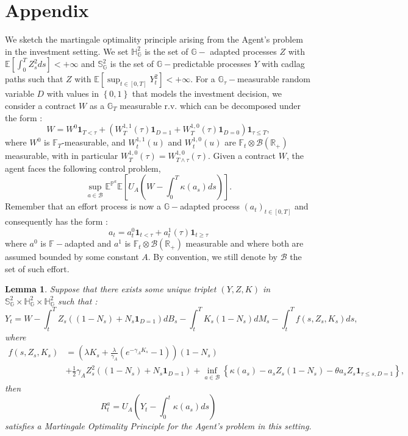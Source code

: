 \documentclass[numbook, envcountsect, envcountsame, envcountreset, runningheads, smallextended]{article}
\newtheorem{Lemma}{Lemma}[part]
\def \E{\mathbb{E}}
\begin{document}
\section{Appendix}
We sketch the martingale optimality principle arising from the Agent’s problem in the investment setting. We set
$\mathbb{H}^2_{\mathbb{G}}$ is the set of $\mathbb{G}-$ adapted processes $Z$ with $\E[\int_0^T Z_s^2 ds] < +\infty$ and $\mathbb{S}^2_{\mathbb{G}}$ is the set of $\mathbb{G}-$predictable processes $Y$ with cadlag paths such that $Z$ with $\E[\sup_{t \in [0,T]}Y^2_t] < +\infty$. For a   $\mathbb{G}_{\tau}-$measurable random variable $D$ with values in $\left\{ 0,1 \right\}$ that models the investment decision, we consider
a contract $W$ as a $\mathbb{G}_T$ measurable r.v. which can be decomposed under the form : 
$$ W = W^{0}\textbf{1}_{T < \tau} + \left( W^{1,1}_T(\tau)\textbf{1}_{D=1} + W^{1,0}_T(\tau)\textbf{1}_{D=0}\right)\textbf{1}_{\tau \leq T},$$
where
$W^{0}$ is $\mathbb{F}_T$-measurable, and $W_t^{1,1}(u)$ and $W_t^{1,0}(u)$ are $\mathbb{F}_t \otimes \mathcal{B}(\mathbb{R}_+)$ measurable, with in particular  $W^{1,0}_T(\tau) = W^{1,0}_{T \wedge \tau}(\tau). $
Given a contract $W$, the agent faces the following control problem,
$$ \sup_{a \in \mathcal{B}} \mathbb{E}^{\mathbb{P}^{a}}\E\left[ U_A\left(W - \int_0^T \kappa(a_s) ds\right)\right].$$
Remember that an effort process is now a $\mathbb{G}-$adapted process $(a_t)_{t \in [0,T]}$ and consequently has the form :
$$ a_t = a_t^{0}\textbf{1}_{t < \tau} + a_t^{1}(\tau) \textbf{1}_{t \geq \tau}$$
where $a^0$ is $\mathbb{F}-$adapted and $a^1$ is $\mathbb{F}_t \otimes \mathcal{B}(\mathbb{R}_+)$ measurable and where both are assumed bounded by some constant $A$. By convention, we still denote by $\mathcal{B}$ the set of such effort.


\begin{Lemma}
Suppose that there exists some unique triplet $(Y, Z, K)$ in $\mathbb{S}^{2}_{\mathbb{G}} \times \mathbb{H}^2_{\mathbb{G}} \times  \mathbb{H}^2_{\mathbb{G}} $ such that : 
$$ Y_t = W - \int_t^T Z_s((1-N_s) + N_s \textbf{1}_{D=1})dB_s - \int_t^T K_s(1-N_s) dM_s - \int_t^T f(s, Z_s, K_s) ds,$$
where 
\begin{align*}
 f(s, Z_s, K_s) &=  \left( \lambda K_s + \frac{\lambda}{\gamma_A} (e^{-\gamma_A K_s}-1)\right)(1-N_s) \\&+
 \frac{1}{2} \gamma_A Z_s^2 ((1-N_s) + N_s \textbf{1}_{D=1})
+ \inf_{a \in \mathcal{B}} \left\{ \kappa(a_s) - a_s Z_s(1-N_s) - \theta a_s Z_s \textbf{1}_{\tau \leq s,  D=1} \right\}, 
\end{align*}
then 
$$ R_t^{a} = U_A\left(Y_t - \int_0^t \kappa(a_s) ds \right)$$
satisfies a Martingale Optimality Principle for the Agent's problem in this setting. 

\end{Lemma}
\end{document}
